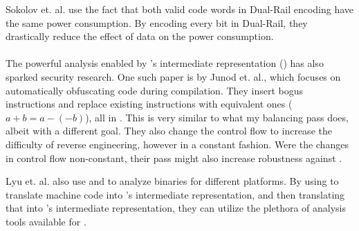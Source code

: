 Sokolov et. al. use the fact that both valid code words in Dual-Rail encoding have the same power consumption.
By encoding every bit in Dual-Rail, they drastically reduce the effect of data on the power consumption.
\\
\\
The powerful analysis enabled by \llvm{}'s intermediate representation (\ir{}) has also sparked security research.
One such paper is by Junod et. al.\cite{junod2015obfuscator}, which focuses on automatically obfuscating code during compilation.
They insert bogus instructions and replace existing instructions with equivalent ones ($a+b = a - (-b)$), all in \ir{}.
This is very similar to what my balancing pass does, albeit with a different goal.
They also change the control flow to increase the difficulty of reverse engineering, however in a constant fashion.
Were the changes in control flow non-constant, their pass might also increase robustness against \poweranalysis{}.

Lyu et. al.\cite{lyu2014dbill} also use \llvm{} and \qemu{} to analyze binaries for different platforms.
By using \qemu{} to translate machine code into \qemu{}'s intermediate representation, and then translating that into \llvm{}'s intermediate representation, they can utilize the plethora of analysis tools available for \llvm{}.
